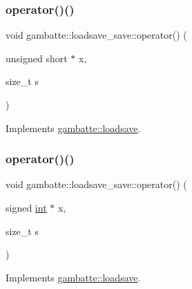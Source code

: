 \subsubsection{\texorpdfstring{operator()()}{operator()()}\hspace{0.1cm}{\footnotesize\ttfamily [13/19]}}
{\footnotesize\ttfamily void gambatte\+::loadsave\+\_\+save\+::operator() (\begin{DoxyParamCaption}\item[{unsigned short $\ast$}]{x,  }\item[{size\+\_\+t}]{s }\end{DoxyParamCaption})\hspace{0.3cm}{\ttfamily [virtual]}}



Implements \hyperlink{classgambatte_1_1loadsave_aa260c68090c6bb3b5620ac77ce70815d}{gambatte\+::loadsave}.

\mbox{\label{classgambatte_1_1loadsave__save_a05d2bb63ce5489b66a040d8ece61765c}} 
\subsubsection{\texorpdfstring{operator()()}{operator()()}\hspace{0.1cm}{\footnotesize\ttfamily [14/19]}}
{\footnotesize\ttfamily void gambatte\+::loadsave\+\_\+save\+::operator() (\begin{DoxyParamCaption}\item[{signed \hyperlink{ioapi_8h_a787fa3cf048117ba7123753c1e74fcd6}{int} $\ast$}]{x,  }\item[{size\+\_\+t}]{s }\end{DoxyParamCaption})\hspace{0.3cm}{\ttfamily [virtual]}}



Implements \hyperlink{classgambatte_1_1loadsave_a9f843edffc4473365246e8620d65f1e3}{gambatte\+::loadsave}.

\mbox{\label{classgambatte_1_1loadsave__save_a19333effc14f2a44a7ae56ee0a2536f4}} 
